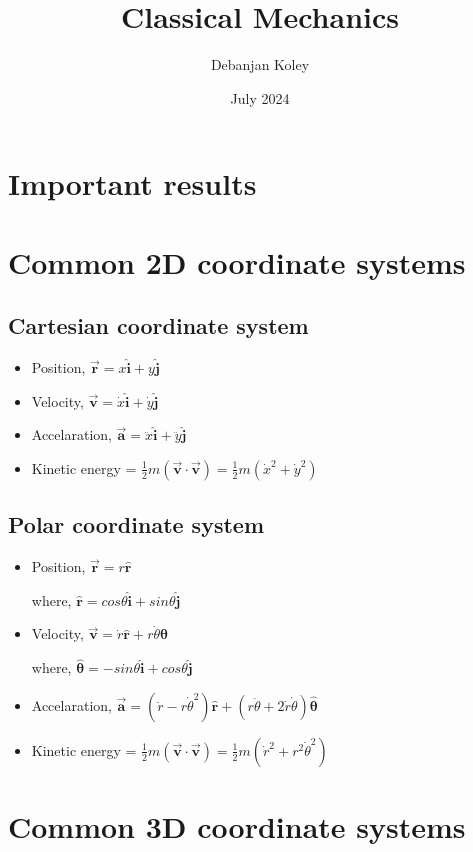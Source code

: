 \documentclass{article}
\title{Classical Mechanics}
\author{Debanjan Koley}
\date{July 2024}
\newcommand{\uvec}[1]{\bm{\hat{#1}}}
\begin{document}
\maketitle
\section*{Important results}
\section{Common 2D coordinate systems}

\subsection{Cartesian coordinate system}
\begin{itemize}
    \item Position, $\bm{\vec{r}} = x\uvec{i} + y\uvec{j}$
    \item Velocity, $\bm{\vec{v}} = \dot{x}\uvec{i} + \dot{y}\uvec{j}$
    \item Accelaration, $\bm{\vec{a}} = \ddot{x}\uvec{i} + \ddot{y}\uvec{j}$
    \item Kinetic energy = $\frac{1}{2}m(\bm{\vec{v}\cdot\vec{v}}) = \frac{1}{2}m(\dot{x}^2 + \dot{y}^2)$
\end{itemize}

\subsection{Polar coordinate system}
\begin{itemize}
    \item Position, $\bm{\vec{r}} = r\uvec{r}$
    
    where, $\uvec{r} = cos\theta\uvec{i} + sin\theta\uvec{j}$
    \item Velocity, $\bm{\vec{v}} = \dot{r}\uvec{r} + r\dot{\theta}\uvec{\theta}$
    
    where, $\uvec{\theta} = -sin\theta\uvec{i} + cos\theta\uvec{j}$
    \item Accelaration, $\bm{\vec{a}} = (\ddot{r} - r\dot{\theta}^2)\uvec{r} + (r\ddot{\theta} + 2\dot{r}\dot{\theta})\uvec{\theta}$
    \item Kinetic energy = $\frac{1}{2}m(\bm{\vec{v}\cdot\vec{v}}) = \frac{1}{2}m(\dot{r}^2 + r^2\dot{\theta}^2)$
\end{itemize}

\section{Common 3D coordinate systems}
\end{document}
